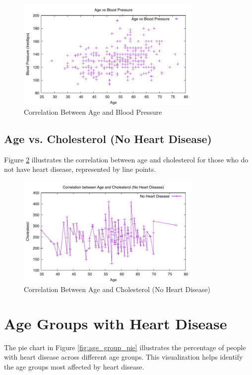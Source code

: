\documentclass{article}
\begin{document}
\begin{figure}[h]
    \centering
    \includegraphics[width=0.8\textwidth]{age_vs_blood_pressure.pdf}
    \caption{Correlation Between Age and Blood Pressure}
    \label{fig:age_vs_bp}
\end{figure}

\subsection{Age vs. Cholesterol (No Heart Disease)}
Figure \ref{fig:age_vs_cholesterol} illustrates the correlation between age and cholesterol for those who do not have heart disease, represented by line points.

\begin{figure}[h]
    \centering
    \includegraphics[width=0.8\textwidth]{age_vs_cholesterol_correlation.pdf}
    \caption{Correlation Between Age and Cholesterol (No Heart Disease)}
    \label{fig:age_vs_cholesterol}
\end{figure}

\section{Age Groups with Heart Disease}
The pie chart in Figure \ref{fig:age_group_pie} illustrates the percentage of people with heart disease across different age groups. This visualization helps identify the age groups most affected by heart disease.
\end{document}

